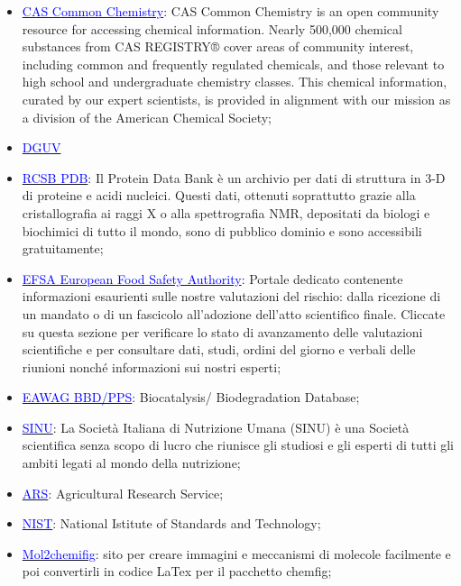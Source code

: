 \begin{footnotesize}
\begin{multicols}{2}
\begin{itemize}
    \item \href{https://commonchemistry.cas.org/}{\textcolor{blue}{CAS Common Chemistry}}: CAS Common Chemistry is an open community resource for accessing chemical information. Nearly 500,000 chemical substances from CAS REGISTRY® cover areas of community interest, including common and frequently regulated chemicals, and those relevant to high school and undergraduate chemistry classes. This chemical information, curated by our expert scientists, is provided in alignment with our mission as a division of the American Chemical Society;
    \item \href{https://dguv.de/corona/index.jsp}{\textcolor{blue}{DGUV}}
    \item \href{https://www.rcsb.org/}{\textcolor{blue}{RCSB PDB}}: Il Protein Data Bank è un archivio per dati di struttura in 3-D di proteine e acidi nucleici. Questi dati, ottenuti soprattutto grazie alla cristallografia ai raggi X o alla spettrografia NMR, depositati da biologi e biochimici di tutto il mondo, sono di pubblico dominio e sono accessibili gratuitamente;
    \item \href{https://www.efsa.europa.eu/it}{\textcolor{blue}{EFSA European Food Safety Authority}}: Portale dedicato contenente informazioni esaurienti sulle nostre valutazioni del rischio: dalla ricezione di un mandato o di un fascicolo all’adozione dell’atto scientifico finale. Cliccate su questa sezione per verificare lo stato di avanzamento delle valutazioni scientifiche e per consultare dati, studi, ordini del giorno e verbali delle riunioni nonché informazioni sui nostri esperti;
    \item \href{http://eawag-bbd.ethz.ch/}{\textcolor{blue}{EAWAG BBD/PPS}}: Biocatalysis/ Biodegradation Database;
    \item \href{https://sinu.it/}{\textcolor{blue}{SINU}}: La Società Italiana di Nutrizione Umana (SINU) è una Società scientifica senza scopo di lucro che riunisce gli studiosi e gli esperti di tutti gli ambiti legati al mondo della nutrizione;
    \item \href{https://www.ars.usda.gov/}{\textcolor{blue}{ARS}}: Agricultural Research Service;
    \item \href{https://www.nist.gov/}{\textcolor{blue}{NIST}}: National Istitute of Standards and Technology;
    \item \href{https://py-chemist.com/mol_2_chemfig/home}{\textcolor{blue}{Mol2chemifig}}: sito per creare immagini e meccanismi di molecole facilmente e poi convertirli in codice LaTex per il pacchetto chemfig;

\end{itemize}
\end{multicols}
\end{footnotesize}
